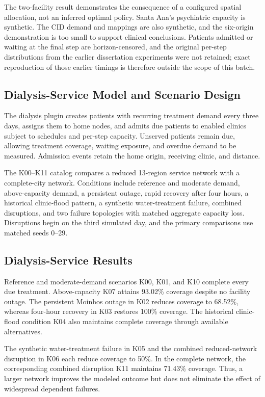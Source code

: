 \documentclass[pdflatex,sn-mathphys-num]{sn-jnl}%
\theoremstyle{thmstyleone}%
\theoremstyle{thmstyletwo}%
\theoremstyle{thmstylethree}%
\begin{document}
The two-facility result demonstrates the consequence of a configured spatial allocation, not an inferred optimal policy. Santa Ana's psychiatric capacity is synthetic. The CID demand and mappings are also synthetic, and the six-origin demonstration is too small to support clinical conclusions. Patients admitted or waiting at the final step are horizon-censored, and the original per-step distributions from the earlier dissertation experiments were not retained; exact reproduction of those earlier timings is therefore outside the scope of this batch.



\subsection{Dialysis-Service Model and Scenario Design}
The dialysis plugin creates patients with recurring treatment demand every three days, assigns them to home nodes, and admits due patients to enabled clinics subject to schedules and per-step capacity. Unserved patients remain due, allowing treatment coverage, waiting exposure, and overdue demand to be measured. Admission events retain the home origin, receiving clinic, and distance.

The K00--K11 catalog compares a reduced 13-region service network with a complete-city network. Conditions include reference and moderate demand, above-capacity demand, a persistent outage, rapid recovery after four hours, a historical clinic-flood pattern, a synthetic water-treatment failure, combined disruptions, and two failure topologies with matched aggregate capacity loss. Disruptions begin on the third simulated day, and the primary comparisons use matched seeds 0--29.



\subsection{Dialysis-Service Results}
Reference and moderate-demand scenarios K00, K01, and K10 complete every due treatment. Above-capacity K07 attains 93.02\% coverage despite no facility outage. The persistent Moinhos outage in K02 reduces coverage to 68.52\%, whereas four-hour recovery in K03 restores 100\% coverage. The historical clinic-flood condition K04 also maintains complete coverage through available alternatives.

The synthetic water-treatment failure in K05 and the combined reduced-network disruption in K06 each reduce coverage to 50\%. In the complete network, the corresponding combined disruption K11 maintains 71.43\% coverage. Thus, a larger network improves the modeled outcome but does not eliminate the effect of widespread dependent failures.
\end{document}
